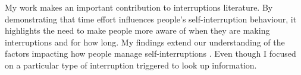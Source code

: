My work makes an important contribution to interruptions literature. By demonstrating that time effort influences people’s self-interruption behaviour, it highlights the need to make people more aware of when they are making interruptions and for how long. My findings extend our understanding of the factors impacting how people manage self-interruptions . Even though I focused on a particular type of interruption triggered to look up information. 
